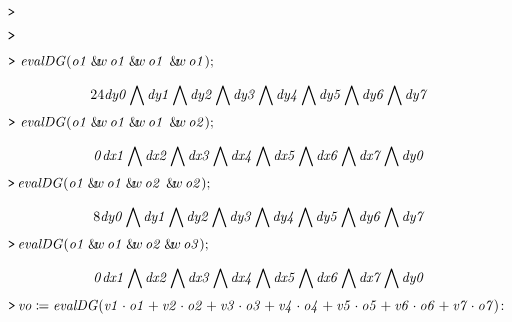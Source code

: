 \documentclass{article}
\begin{document}
\mapleinput
{$ \displaystyle \texttt{>\,} \, $}

\mapleinput
{$ \displaystyle \texttt{>\,} \, $}

\mapleinput
{$ \displaystyle \texttt{>\,} \,\mathit{evalDG} (\mathit{o1} \:\&\!\!w \,\mathit{o1} \:\&\!\!w \,\mathit{o1} \,\:\&\!\!w \,\mathit{o1}); $}

\begin{dmath}\label{(85)}
24 \mathit{dy0}  \bigwedge  \mathit{dy1}  \bigwedge  \mathit{dy2}  \bigwedge  \mathit{dy3}  \bigwedge  \mathit{dy4}  \bigwedge  \mathit{dy5}  \bigwedge  \mathit{dy6} 
\\
 \bigwedge  \mathit{dy7} 
\end{dmath}
\mapleinput
{$ \displaystyle \texttt{>\,} \,\mathit{evalDG} (\mathit{o1} \:\&\!\!w \,\mathit{o1} \:\&\!\!w \,\mathit{o1} \,\:\&\!\!w \,\mathit{o2}); $}

\begin{dmath}\label{(86)}
\mathit{0} \mathit{dx1}  \bigwedge  \mathit{dx2}  \bigwedge  \mathit{dx3}  \bigwedge  \mathit{dx4}  \bigwedge  \mathit{dx5}  \bigwedge  \mathit{dx6}  \bigwedge  \mathit{dx7} 
\\
 \bigwedge  \mathit{dy0} 
\end{dmath}
\mapleinput
{$ \displaystyle \texttt{>\,} \mathit{evalDG} (\mathit{o1} \:\&\!\!w \,\mathit{o1} \:\&\!\!w \,\mathit{o2} \,\:\&\!\!w \,\mathit{o2}); $}

\begin{dmath}\label{(87)}
8 \mathit{dy0}  \bigwedge  \mathit{dy1}  \bigwedge  \mathit{dy2}  \bigwedge  \mathit{dy3}  \bigwedge  \mathit{dy4}  \bigwedge  \mathit{dy5}  \bigwedge  \mathit{dy6} 
\\
 \bigwedge  \mathit{dy7} 
\end{dmath}
\mapleinput
{$ \displaystyle \texttt{>\,} \mathit{evalDG} (\mathit{o1} \:\&\!\!w \,\mathit{o1} \:\&\!\!w \,\mathit{o2} \:\&\!\!w \,\mathit{o3}); $}

\begin{dmath}\label{(88)}
\mathit{0} \mathit{dx1}  \bigwedge  \mathit{dx2}  \bigwedge  \mathit{dx3}  \bigwedge  \mathit{dx4}  \bigwedge  \mathit{dx5}  \bigwedge  \mathit{dx6}  \bigwedge  \mathit{dx7} 
\\
 \bigwedge  \mathit{dy0} 
\end{dmath}
\mapleinput
{$ \displaystyle \texttt{>\,} \mathit{vo} \coloneqq \mathit{evalDG} (\mathit{v1} \cdot \mathit{o1} +\mathit{v2} \cdot \mathit{o2} +\mathit{v3} \cdot \mathit{o3} +\mathit{v4} \cdot \mathit{o4} +\mathit{v5} \cdot \mathit{o5} +\mathit{v6} \cdot \mathit{o6} +\mathit{v7} \cdot \mathit{o7})\colon  $}
\end{document}
